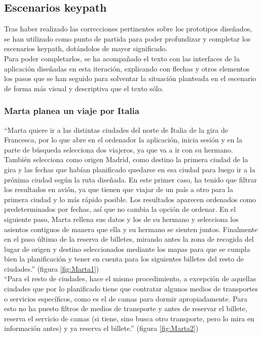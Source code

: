 \subsection{Escenarios keypath}
Tras haber realizado las correcciones pertinentes sobre los prototipos diseñados, se han utilizado como punto de partida para poder profundizar y completar los
escenarios keypath, dotándolos de mayor significado. \\

Para poder completarlos, se ha acompañado el texto con las interfaces de la aplicación diseñadas en esta iteración, explicando con flechas y otros elementos los pasos
que se han seguido para solventar la situación planteada en el escenario de forma más visual y descriptiva que el texto sólo.

\subsubsection{Marta planea un viaje por Italia}
“Marta quiere ir a las distintas ciudades del norte de Italia de la gira de Francesca, por lo que abre en el ordenador la aplicación, inicia sesión y en la parte de búsqueda selecciona dos viajeros, ya que va a ir con su hermano. También selecciona como origen Madrid, como destino la primera ciudad de la gira y las fechas que habían planificado quedarse en esa ciudad para luego ir a la próxima ciudad según la ruta diseñada. 
En este primer caso, ha tenido que filtrar los resultados en avión, ya que tienen que viajar de un país a otro para la primera ciudad y lo más rápido posible. Los resultados aparecen ordenados como predeterminados por fechas, así que no cambia la opción de ordenar. 
En el siguiente paso, Marta rellena sus datos y los de su hermano y selecciona los asientos contiguos de manera que ella y su hermano se sienten juntos.
Finalmente en el paso último de la reserva de billetes, mirando antes la zona de recogida del lugar de origen y destino seleccionados mediante los mapas para que se cumpla bien la planificación y tener en cuenta para los siguientes billetes del resto de ciudades.” (figura \ref{fig:Marta1}) \\


“Para el resto de ciudades, hace el mismo procedimiento, a excepción de aquellas ciudades que por lo planificado tiene que contratar algunos medios de transportes 
o servicios específicos, como es el de camas para dormir apropiadamente. Para esto no ha puesto filtros de medios de transporte y antes de reservar el billete, 
reserva el servicio de camas (si tiene, sino busca otro transporte, pero lo mira en información antes) y ya reserva el billete.” (figura \ref{fig:Marta2}) \\

